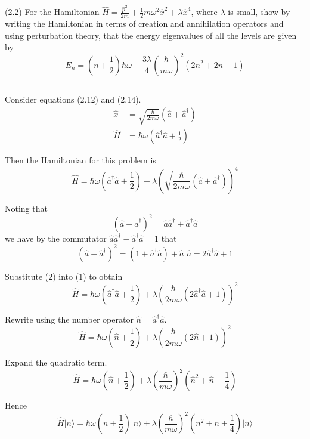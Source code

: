 \documentclass[12pt]{article}
\begin{document}
(2.2)
For the Hamiltonian
$\hat H=\frac{\hat p^2}{2m}+\frac{1}{2}m\omega^2\hat x^2+\lambda\hat x^4$,
where $\lambda$ is small, show by writing the Hamiltonian
in terms of creation and annihilation operators and
using perturbation theory, that the energy eigenvalues
of all the levels are given by
\begin{equation*}
E_n=\left(n+\frac{1}{2}\right)\hbar\omega
+\frac{3\lambda}{4}\left(\frac{\hbar}{m\omega}\right)^2
\left(2n^2+2n+1\right)
\tag{2.67}
\end{equation*}

\bigskip
\hrule

\bigskip
Consider equations (2.12) and (2.14).
\begin{align*}
\hat x&=\sqrt{\frac{\hbar}{2m\omega}}\left(\hat a+\hat a^\dag\right)
\tag{2.12}
\\
\hat H&=\hbar\omega\left(\hat a^\dag\hat a+\frac{1}{2}\right)
\tag{2.14}
\end{align*}

Then the Hamiltonian for this problem is
\begin{equation*}
\hat H=\hbar\omega\left(\hat a^\dag\hat a+\frac{1}{2}\right)
+\lambda\left(\sqrt{\frac{\hbar}{2m\omega}}\left(\hat a+\hat a^\dag\right)\right)^4
\tag{1}
\end{equation*}

Noting that
\begin{equation*}
\left(\hat a+\hat a^\dag\right)^2
=\hat a\hat a^\dag+\hat a^\dag\hat a
\end{equation*}
we have by the commutator $\hat a\hat a^\dag-\hat a^\dag\hat a=1$ that
\begin{equation*}
\left(\hat a+\hat a^\dag\right)^2
=(1+\hat a^\dag\hat a)+\hat a^\dag\hat a=2\hat a^\dag\hat a+1
\tag{2}
\end{equation*}

Substitute (2) into (1) to obtain
\begin{equation*}
\hat H=\hbar\omega\left(\hat a^\dag\hat a+\frac{1}{2}\right)
+\lambda\left(\frac{\hbar}{2m\omega}\left(2\hat a^\dag\hat a+1\right)\right)^2
\end{equation*}

Rewrite using the number operator $\hat n=\hat a^\dag\hat a$.
\begin{equation*}
\hat H=\hbar\omega\left(\hat n+\frac{1}{2}\right)
+\lambda\left(\frac{\hbar}{2m\omega}\left(2\hat n+1\right)\right)^2
\end{equation*}

Expand the quadratic term.
\begin{equation*}
\hat H=\hbar\omega\left(\hat n+\frac{1}{2}\right)
+\lambda\left(\frac{\hbar}{m\omega}\right)^2\left(\hat n^2+\hat n+\frac{1}{4}\right)
\end{equation*}

Hence
\begin{equation*}
\hat H\vert n\rangle
=\hbar\omega\left(n+\frac{1}{2}\right)\vert n\rangle
+\lambda\left(\frac{\hbar}{m\omega}\right)^2\left(n^2+n+\frac{1}{4}\right)\vert n\rangle
\end{equation*}
\end{document}
